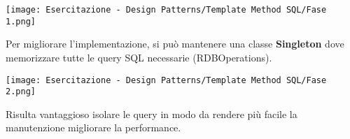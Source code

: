 {    \begin{center}
        \texttt{[image: Esercitazione - Design Patterns/Template Method SQL/Fase 1.png]}
    \end{center}

    Per migliorare l'implementazione,
    si può mantenere una classe \textbf{Singleton} dove memorizzare tutte le query SQL necessarie (RDBOperations).

    \begin{center}
        \texttt{[image: Esercitazione - Design Patterns/Template Method SQL/Fase 2.png]}
    \end{center}

    Risulta vantaggioso isolare le query in modo da rendere più facile la manutenzione migliorare la performance.
    \newpage
    }